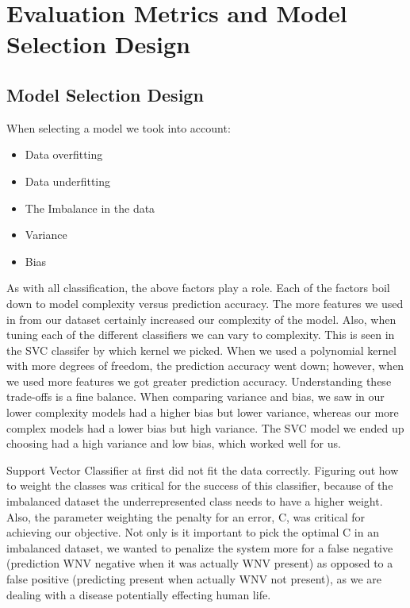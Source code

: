 \documentclass{article} %
\begin{document}
\section{Evaluation Metrics and Model Selection Design}
\subsection{Model Selection Design}

When selecting a model we took into account:
\begin{itemize}
\item Data overfitting

\item Data underfitting

\item  The Imbalance in the data

\item  Variance

\item  Bias
\end{itemize}

As with all classification, the above factors play a role.  Each of the factors boil down to model complexity versus prediction accuracy.  The more features we used in from our dataset certainly increased our complexity of the model.  Also, when tuning each of the different classifiers we can vary to complexity.  This is seen in the SVC classifer by which kernel we picked.  When we used a polynomial kernel with more degrees of freedom, the prediction accuracy went down; however, when we used more features we got greater prediction accuracy.  Understanding these trade-offs is a fine balance.  When comparing variance and bias, we saw in our lower complexity models had a higher bias but lower variance, whereas our more complex models had a lower bias but high variance.  The SVC model we ended up choosing had a high variance and low bias, which worked well for us.  

Support Vector Classifier at first did not fit the data correctly.  Figuring out how to weight the classes was critical for the success of this classifier, because of the imbalanced dataset the underrepresented class needs to have a higher weight.  Also, the parameter weighting the penalty for an error, C, was critical for achieving our objective.  Not only is it important to pick the optimal C in an imbalanced dataset, we wanted to penalize the system more for a false negative (prediction WNV negative when it was actually WNV present) as opposed to a false positive (predicting present when actually WNV not present), as we are dealing with a disease potentially effecting human life.
\end{document}
